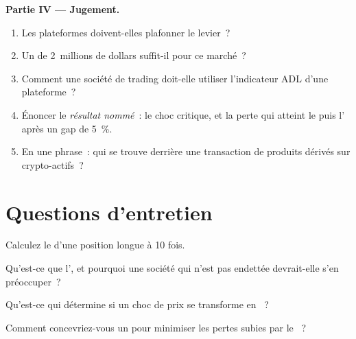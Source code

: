 \begin{problem}
\medskip\noindent\textbf{Partie IV --- Jugement.}
\begin{enumerate}[resume]
\item Les plateformes doivent-elles plafonner le levier~?
\item Un  de 2~millions de dollars suffit-il pour ce marché~?
\item Comment une société de trading doit-elle utiliser l'indicateur ADL d'une plateforme~?
\item Énoncer le \emph{résultat nommé}~: le choc critique, et la perte qui atteint le  puis
l' après un gap de 5~\%.
\item En une phrase~: qui se trouve derrière une transaction de produits dérivés sur crypto-actifs~?
\end{enumerate}
\end{problem}

\section{Questions d'entretien}

\begin{interviewq}\label{iq:m3:margin-liquidation-and-loss-allocation:1}
Calculez le  d'une position longue à 10 fois.
\end{interviewq}

\begin{interviewq}\label{iq:m3:margin-liquidation-and-loss-allocation:2}
Qu'est-ce que l', et pourquoi une société qui n'est pas endettée devrait-elle s'en préoccuper~?
\end{interviewq}

\begin{interviewq}\label{iq:m3:margin-liquidation-and-loss-allocation:3}
Qu'est-ce qui détermine si un choc de prix se transforme en ~?
\end{interviewq}

\begin{interviewq}\label{iq:m3:margin-liquidation-and-loss-allocation:4}
Comment concevriez-vous un  pour minimiser les pertes subies par le ~?
\end{interviewq}

